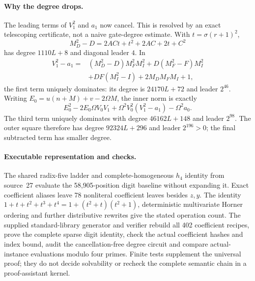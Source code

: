 \paragraph{Why the degree drops.}
The leading terms of $V_1^2$ and $a_1$ now cancel.  This is resolved by an
exact telescoping certificate, not a naive gate-degree estimate.  With
$t=\sigma(r+1)^2$,
\[
 M_D^2-D=2ACt+t^2+2AC+2t+C^2
\]
has degree $1110L+8$ and diagonal leader $4$.  In
\begin{align*}
 V_1^2-a_1={}&(M_D^2-D)M_F^2M_I^2
 +D(M_F^2-F)M_I^2\\
 &+DF(M_I^2-I)+2M_DM_FM_I+1,
\end{align*}
the first term uniquely dominates: its degree is $24170L+72$ and leader
$2^{46}$.  Writing $E_0=u(n+M)+v-2\Omega M$, the inner norm is exactly
\[
 E_0^2-2E_0\Omega V_0V_1+\Omega^2V_0^2(V_1^2-a_1)-\Omega^2a_0.
\]
The third term uniquely dominates with degree $46162L+148$ and leader
$2^{98}$.  The outer square therefore has degree $92324L+296$ and
leader $2^{196}>0$; the final subtracted term has smaller degree.

\paragraph{Executable representation and checks.}
The shared radix-five ladder and complete-homogeneous $h_4$ identity from
source~27 evaluate the 58,905-position digit baseline without expanding it.
Exact coefficient aliases leave 78 nonliteral coefficient leaves besides
$z,y$.  The identity
$1+t+t^2+t^3+t^4=1+(t^2+t)(t^2+1)$, deterministic multivariate Horner
ordering and further distributive rewrites give the stated operation count.
The supplied standard-library generator and verifier rebuild all 402
coefficient recipes, prove the complete sparse digit identity, check the
actual coefficient hashes and index bound, audit the cancellation-free
degree circuit and compare actual-instance evaluations modulo four primes.
Finite tests supplement the universal proof; they do not decide
solvability or recheck the complete semantic chain in a proof-assistant
kernel.
